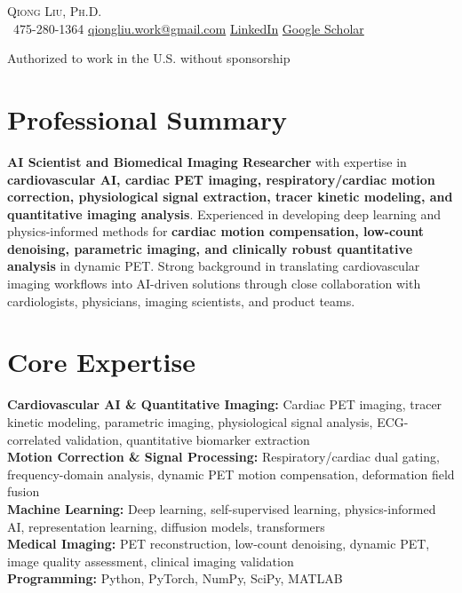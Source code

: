 \begin{center}
{\Huge \scshape Qiong Liu, Ph.D.} \\ \vspace{4pt}
\small
\faPhone\ 475-280-1364 \quad
\href{mailto:qiongliu.work@gmail.com}{qiongliu.work@gmail.com} \quad
\href{https://www.linkedin.com/in/qiong-l-529b23196}{LinkedIn} \quad
\href{https://scholar.google.com/citations?user=SvnpHCkAAAAJ&hl=en}{Google Scholar}

Authorized to work in the U.S. without sponsorship
\end{center}

\section{Professional Summary}
\textbf{AI Scientist and Biomedical Imaging Researcher} with expertise in \textbf{cardiovascular AI, cardiac PET imaging, respiratory/cardiac motion correction, physiological signal extraction, tracer kinetic modeling, and quantitative imaging analysis}. Experienced in developing deep learning and physics-informed methods for \textbf{cardiac motion compensation, low-count denoising, parametric imaging, and clinically robust quantitative analysis} in dynamic PET. Strong background in translating cardiovascular imaging workflows into AI-driven solutions through close collaboration with cardiologists, physicians, imaging scientists, and product teams.

\section{Core Expertise}
\textbf{Cardiovascular AI \& Quantitative Imaging:} Cardiac PET imaging, tracer kinetic modeling, parametric imaging, physiological signal analysis, ECG-correlated validation, quantitative biomarker extraction \\
\textbf{Motion Correction \& Signal Processing:} Respiratory/cardiac dual gating, frequency-domain analysis, dynamic PET motion compensation, deformation field fusion \\
\textbf{Machine Learning:} Deep learning, self-supervised learning, physics-informed AI, representation learning, diffusion models, transformers \\
\textbf{Medical Imaging:} PET reconstruction, low-count denoising, dynamic PET, image quality assessment, clinical imaging validation \\
\textbf{Programming:} Python, PyTorch, NumPy, SciPy, MATLAB

